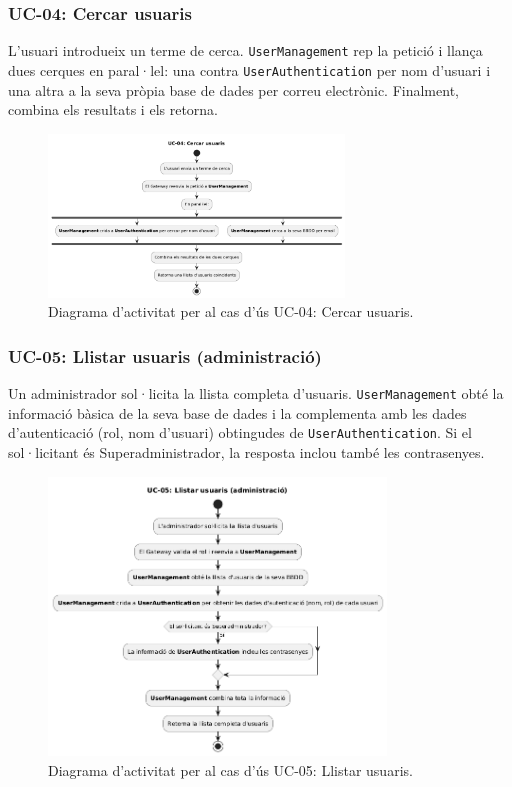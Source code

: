 \subsubsection{UC-04: Cercar usuaris}
L'usuari introdueix un terme de cerca. \texttt{UserManagement} rep la petició i llança dues cerques en paral·lel: una contra \texttt{UserAuthentication} per nom d'usuari i una altra a la seva pròpia base de dades per correu electrònic. Finalment, combina els resultats i els retorna.

\begin{figure}[H]
    \centering
    \includegraphics[width=0.7\textwidth]{Figures/ad_UC04.png}
    \caption{Diagrama d'activitat per al cas d'ús UC-04: Cercar usuaris.}
    \label{fig:ad_uc04_app}
\end{figure}

\subsubsection{UC-05: Llistar usuaris (administració)}
Un administrador sol·licita la llista completa d'usuaris. \texttt{UserManagement} obté la informació bàsica de la seva base de dades i la complementa amb les dades d'autenticació (rol, nom d'usuari) obtingudes de \texttt{UserAuthentication}. Si el sol·licitant és Superadministrador, la resposta inclou també les contrasenyes.

\begin{figure}[H]
    \centering
    \includegraphics[width=0.8\textwidth]{Figures/ad_UC05.png}
    \caption{Diagrama d'activitat per al cas d'ús UC-05: Llistar usuaris.}
    \label{fig:ad_uc05_app}
\end{figure}

